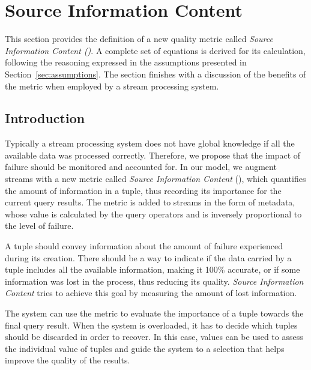 \section{Source Information Content}
\label{sec:sic}


This section provides the definition of a new quality metric called \emph{Source Information Content
(\sic)}. A complete set of equations is derived for
its calculation, following the reasoning expressed in the assumptions presented in
Section~\ref{sec:assumptions}. The section finishes with a discussion of the benefits of the \sic metric
when employed by a stream processing system.

\subsection*{Introduction}

Typically a stream processing system does not have global knowledge if all the
available data was processed correctly. 
Therefore, we propose that the impact of failure should be monitored and accounted for. 
In our model, we augment streams with a new metric called \textit{Source Information Content}
(\sic), which quantifies the amount of information in a tuple, thus recording its
importance for the current query results. The \sic metric is added to streams in the form of metadata,
whose value is calculated by the query operators and is inversely proportional to the level of failure.

A tuple should convey information about the amount of failure experienced during its creation. There
should be a way to indicate if the data carried by a tuple includes all the available
information, making it 100\% accurate, or if some information was lost in the process, thus reducing
its quality. \textit{Source Information Content} tries to achieve
this goal by measuring the amount of lost information.

The system can use the \sic metric to evaluate the importance of a tuple towards the final query result. 
When the system is overloaded, it has to decide which tuples should
be discarded in order to recover. In this case, \sic values can be used to assess the
individual value of tuples and guide the system to a selection that helps improve the quality of the
results.

